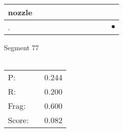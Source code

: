 \documentclass[landscape]{article}
\newcommand{\ssp}{\hspace{2pt}}
\newcommand{\mex}{\cellcolor{g}$\bullet$}
\begin{document}
\begin{tabular}{|l|p{10pt}|p{10pt}|p{10pt}|p{10pt}|p{10pt}|p{10pt}|p{10pt}|p{10pt}|p{10pt}|p{10pt}|}
\hline
\ssp nozzle \ssp&\hspace{2pt}&\hspace{2pt}&\hspace{2pt}&\hspace{2pt}&\hspace{2pt}&\hspace{2pt}&\hspace{2pt}&\hspace{2pt}&\hspace{2pt}&\hspace{2pt}\\
\hline
\ssp \cellcolor{ref9}. \ssp&\hspace{2pt}&\hspace{2pt}&\hspace{2pt}&\hspace{2pt}&\hspace{2pt}&\hspace{2pt}&\hspace{2pt}&\hspace{2pt}&\hspace{2pt}&\hspace{2pt}\mex\\
\hline
\end{tabular}

\vspace{6pt}
\noindent Segment 77\\\\
\noindent\begin{tabular}{lm{12pt}r}
\hline
P:&&0.244\\
R:&&0.200\\
Frag:&&0.600\\
Score:&&0.082\\
\end{tabular}

\newpage
\end{document}
